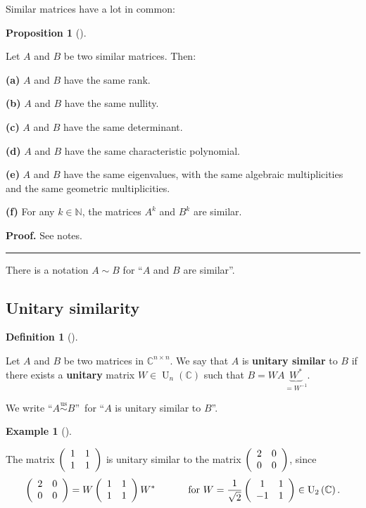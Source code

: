 \documentclass[numbers=enddot,12pt,final,onecolumn,notitlepage]{scrartcl}%
\numberwithin{exer}{subsection}
\theoremstyle{definition}
\newtheorem{prop}[theo]{Proposition}
\newenvironment{proposition}[1][]
{\begin{prop}[#1]\begin{leftbar}}
{\end{leftbar}\end{prop}}
\newtheorem{defi}[theo]{Definition}
\newenvironment{definition}[1][]
{\begin{defi}[#1]\begin{leftbar}}
{\end{leftbar}\end{defi}}
\newtheorem{exam}[theo]{Example}
\newenvironment{example}[1][]
{\begin{exam}[#1]\begin{leftbar}}
{\end{leftbar}\end{exam}}
\newenvironment{proof}[1][Proof]{\noindent\textbf{#1.} }{\ \rule{0.5em}{0.5em}}
\begin{document}
Similar matrices have a lot in common:

\begin{proposition}
Let $A$ and $B$ be two similar matrices. Then:

\textbf{(a)} $A$ and $B$ have the same rank.

\textbf{(b)} $A$ and $B$ have the same nullity.

\textbf{(c)} $A$ and $B$ have the same determinant.

\textbf{(d)} $A$ and $B$ have the same characteristic polynomial.

\textbf{(e)} $A$ and $B$ have the same eigenvalues, with the same algebraic
multiplicities and the same geometric multiplicities.

\textbf{(f)} For any $k\in\mathbb{N}$, the matrices $A^{k}$ and $B^{k}$ are similar.
\end{proposition}

\begin{proof}
See notes.
\end{proof}

There is a notation $A\sim B$ for \textquotedblleft$A$ and $B$ are
similar\textquotedblright.

\subsection{Unitary similarity}

\begin{definition}
Let $A$ and $B$ be two matrices in $\mathbb{C}^{n\times n}$. We say that $A$
is \textbf{unitary similar} to $B$ if there exists a \textbf{unitary} matrix
$W\in\operatorname*{U}\nolimits_{n}\left(  \mathbb{C}\right)  $ such that
$B=WA\underbrace{W^{\ast}}_{=W^{-1}}$.

We write \textquotedblleft$A\overset{\text{us}}{\sim}B$\textquotedblright\ for
\textquotedblleft$A$ is unitary similar to $B$\textquotedblright.
\end{definition}

\begin{example}
The matrix $\left(
\begin{array}
[c]{cc}%
1 & 1\\
1 & 1
\end{array}
\right)  $ is unitary similar to the matrix $\left(
\begin{array}
[c]{cc}%
2 & 0\\
0 & 0
\end{array}
\right)  $, since
\[
\left(
\begin{array}
[c]{cc}%
2 & 0\\
0 & 0
\end{array}
\right)  =W\left(
\begin{array}
[c]{cc}%
1 & 1\\
1 & 1
\end{array}
\right)  W^{\ast}\ \ \ \ \ \ \ \ \ \ \text{for }W=\dfrac{1}{\sqrt{2}}\left(
\begin{array}
[c]{cc}%
1 & 1\\
-1 & 1
\end{array}
\right)  \in\operatorname*{U}\nolimits_{2}\left(  \mathbb{C}\right)  .
\]

\end{example}
\end{document}
